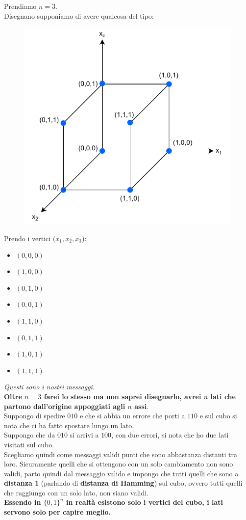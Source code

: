\documentclass[a4paper,12pt, oneside]{book}
\begin{document}
\begin{esempio}
  Prendiamo $n=3$. \\
  Disegnano supponiamo di avere qualcosa del tipo:
  \begin{figure}[H]
    \centering
    \includegraphics[scale = 0.8]{img/cubeh.pdf}
  \end{figure}
  Prendo i vertici $(x_1,x_2,x_3$):
  \begin{itemize}
    \item $(0,0,0)$
    \item $(1,0,0)$
    \item $(0,1,0)$
    \item $(0,0,1)$
    \item $(1,1,0)$
    \item $(0,1,1)$
    \item $(1,0,1)$
    \item $(1,1,1)$
  \end{itemize}
  \textit{Questi sono i nostri messaggi}.\\
  \textbf{Oltre $n=3$ farei lo stesso ma non saprei disegnarlo, avrei $n$
    lati che partono dall'origine appoggiati agli $n$ assi}.\\
  Suppongo di spedire $010$ e che si abbia un errore che porti a $110$ e sul
  cubo si nota che ci ha fatto spostare lungo un lato. \\
  Suppongo che da $010$ si arrivi a $100$, con due errori, si nota che ho due
  lati visitati sul cubo.\\
  Scegliamo quindi come messaggi validi punti che sono abbastanza distanti tra
  loro. Sicuramente quelli che si ottengono con un solo cambiamento non sono
  validi, parto quindi dal messaggio valido e impongo che tutti quelli che sono
  a \textbf{distanza 1} (parlando di \textbf{distanza di Hamming}) sul cubo,
  ovvero tutti quelli che raggiungo con un solo lato, non siano validi.\\
  \textbf{Essendo in $\{0,1\}^n$ in realtà esistono solo i vertici del cubo, i
    lati servono solo per capire meglio.}
\end{esempio}
\end{document}
